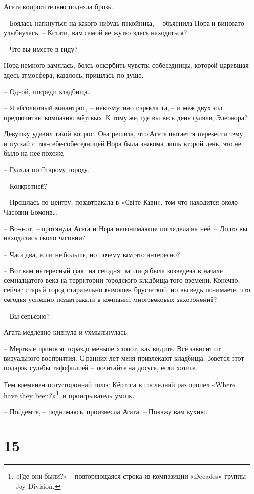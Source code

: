 \documentclass[
  a5paperpaper,
  DIV=11,
  numbers=noendperiod]{scrreprt}
\begin{document}
Агата вопросительно подняла бровь.

-- Боялась наткнуться на какого-нибудь покойника, -- объяснила Нора и
виновато улыбнулась. -- Кстати, вам самой не жутко здесь находиться?

-- Что вы имеете в виду?

Нора немного замялась, боясь оскорбить чувства собеседницы, которой
царившая здесь атмосфера, казалось, пришлась по душе.

-- Одной, посреди кладбища\ldots{}

-- Я абсолютный мизантроп, -- невозмутимо изрекла та, -- и меж двух зол
предпочитаю компанию мёртвых. К тому же, где вы весь день гуляли,
Элеонора?

Девушку удивил такой вопрос. Она решила, что Агата пытается перевести
тему, и пускай с так-себе-собеседницей Нора была знакома лишь второй
день, это не было на неё похоже.

-- Гуляла по Старому городу.

-- Конкретней?

-- Прошлась по центру, позавтракала в «Світе Кави», том что находится
около Часовни Бомоив\ldots{}

-- Во-о-от, -- протянула Агата и Нора непонимающе поглядела на неё. --
Долго вы находились около часовни?

-- Часа два, если не больше, но почему вам это интересно?

-- Вот вам интересный факт на сегодня: каплиця была возведена в начале
семнадцатого века на территории городского кладбища того времени.
Конечно, сейчас старый город старательно вымощен брусчаткой, но вы ведь
понимаете, что сегодня успешно позавтракали в компании многовековых
захоронений?

-- Вы серьезно?

Агата медленно кивнула и ухмыльнулась.

-- Мертвые приносят гораздо меньше хлопот, как видите. Всё зависит от
визуального восприятия. С ранних лет меня привлекают кладбища. Зовется
этот подарок судьбы тафофилией -- почитайте на досуге, если хотите.

Тем временем потусторонний голос Кёртиса в последний раз пропел «Where
have they been?»\footnote{«Где они были?» -- повторяющаяся строка из
  композиции «Decades» группы Joy Division.}, и проигрыватель умолк.

-- Пойдемте, -- поднимаясь, произнесла Агата. -- Покажу вам кухню.

\section*{15}\label{15}
\end{document}
